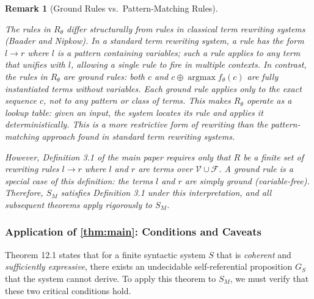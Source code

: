 \documentclass[11pt]{article}
\newtheorem{remark}[theorem]{Remark}
\begin{document}
\begin{remark}[Ground Rules vs.\ Pattern-Matching Rules]
\label{rem:ground_rules}

The rules in $R_\theta$ differ structurally from rules in classical term rewriting systems (Baader and Nipkow). In a standard term rewriting system, a rule has the form $l \to r$ where $l$ is a pattern containing variables; such a rule applies to any term that unifies with $l$, allowing a single rule to fire in multiple contexts. In contrast, the rules in $R_\theta$ are \textit{ground rules}: both $c$ and $c \oplus \operatorname{argmax} f_\theta(c)$ are fully instantiated terms without variables. Each ground rule applies only to the exact sequence $c$, not to any pattern or class of terms. This makes $R_\theta$ operate as a lookup table: given an input, the system locates its rule and applies it deterministically. This is a \textit{more restrictive} form of rewriting than the pattern-matching approach found in standard term rewriting systems.

However, Definition 3.1 of the main paper requires only that $R$ be a finite set of rewriting rules $l \to r$ where $l$ and $r$ are terms over $\mathcal{V} \cup \mathcal{F}$. A ground rule is a special case of this definition: the terms $l$ and $r$ are simply ground (variable-free). Therefore, $S_M$ satisfies Definition 3.1 under this interpretation, and all subsequent theorems apply rigorously to $S_M$.

\end{remark}

\subsubsection{Application of \ref{thm:main}: Conditions and Caveats}

Theorem 12.1 states that for a finite syntactic system $S$ that is \textit{coherent} and \textit{sufficiently expressive}, there exists an undecidable self-referential proposition $G_S$ that the system cannot derive. To apply this theorem to $S_M$, we must verify that these two critical conditions hold.
\end{document}
